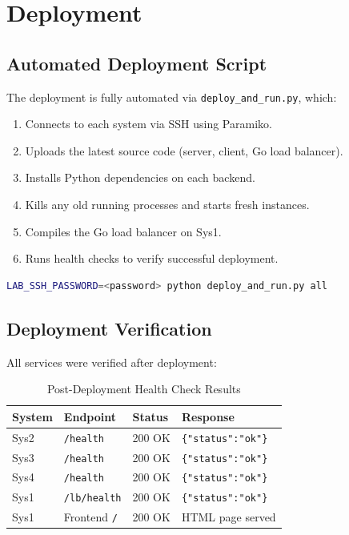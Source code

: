\documentclass[12pt, a4paper]{article}
\begin{document}
\section{Deployment}

\subsection{Automated Deployment Script}

The deployment is fully automated via \texttt{deploy\_and\_run.py}, which:

\begin{enumerate}
    \item Connects to each system via SSH using Paramiko.
    \item Uploads the latest source code (server, client, Go load balancer).
    \item Installs Python dependencies on each backend.
    \item Kills any old running processes and starts fresh instances.
    \item Compiles the Go load balancer on Sys1.
    \item Runs health checks to verify successful deployment.
\end{enumerate}

\begin{lstlisting}[language=bash, caption={One-command deployment}]
LAB_SSH_PASSWORD=<password> python deploy_and_run.py all
\end{lstlisting}

\subsection{Deployment Verification}

All services were verified after deployment:

\begin{table}[H]
\centering
\caption{Post-Deployment Health Check Results}
\label{tab:healthchecks}
\begin{tabular}{llll}
\toprule
\textbf{System} & \textbf{Endpoint} & \textbf{Status} & \textbf{Response} \\
\midrule
Sys2 & \texttt{/health} & 200 OK & \texttt{\{"status":"ok"\}} \\
Sys3 & \texttt{/health} & 200 OK & \texttt{\{"status":"ok"\}} \\
Sys4 & \texttt{/health} & 200 OK & \texttt{\{"status":"ok"\}} \\
Sys1 & \texttt{/lb/health} & 200 OK & \texttt{\{"status":"ok"\}} \\
Sys1 & Frontend \texttt{/} & 200 OK & HTML page served \\
\bottomrule
\end{tabular}
\end{table}
\end{document}
